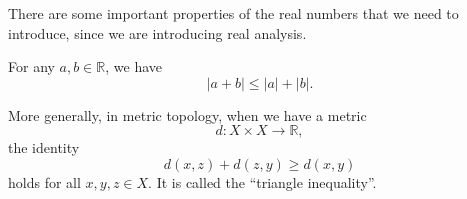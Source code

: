 There are some important properties of the real numbers that we
need to introduce, since we are introducing real analysis.

\begin{prop}
For any $a,b\in\mathbb{R}$, we have
\begin{equation}
|a+b|\leq|a|+|b|.
\end{equation}
\end{prop}
\begin{rmk}
More generally, in metric topology, when we have a metric
$$d:X\times X\to\mathbb{R},$$ the identity
\begin{equation}
d(x,z)+d(z,y)\geq d(x,y)
\end{equation}
holds for all $x,y,z\in X$. It is called the ``triangle inequality''.
\end{rmk}

